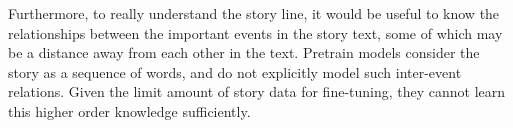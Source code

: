 Furthermore, to really understand the story line, it would be useful to
know the relationships between the important events in the story text,
some of which may be a distance away from each other in the text. 
Pretrain models consider the story as a sequence of words, and do not
explicitly model such inter-event relations. Given the limit amount of
story data for fine-tuning, they cannot learn this higher order knowledge
sufficiently. 

%
 



